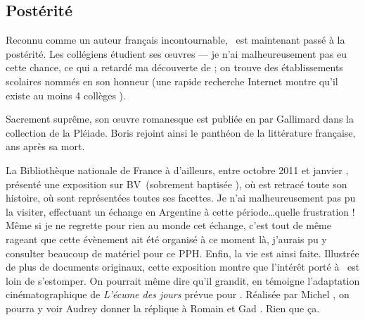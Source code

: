 \subsection{Postérité}
Reconnu comme un auteur français incontournable, \BV\ est maintenant passé à la postérité.
Les collégiens étudient ses \oe{}uvres --- je n'ai malheureusement pas eu cette chance,
ce qui a retardé ma découverte de \BV; on trouve des établissements scolaires nommés en
son honneur (une rapide recherche Internet montre qu'il existe au moins 4 collèges \BV).

Sacrement suprême, son \oe{}uvre romanesque est publiée en  par Gallimard dans la collection
de la Pléiade. Boris rejoint ainsi le panthéon de la littérature française,  ans après sa mort.

La Bibliothèque nationale de France à d'ailleurs, entre octobre 2011 et janvier , présenté
une exposition sur BV\ (sobrement baptisée \emph{\BV}), où est retracé toute son histoire, où sont
représentées toutes ses facettes. Je n'ai malheureusement pas pu la visiter, effectuant un échange en Argentine à cette période\ldots quelle frustration ! Même si je ne regrette pour rien au monde cet échange, c'est tout de même rageant que cette évènement ait été organisé à ce moment là, j'aurais pu y consulter beaucoup de matériel pour ce PPH. Enfin, la vie est ainsi faite. Illustrée de plus de  documents originaux, cette
exposition montre que l'intérêt porté à \BV\ est loin de s'estomper. On pourrait même dire qu'il
grandit, en témoigne l'adaptation cinématographique de \emph{L'écume des jours} prévue pour .
Réalisée par Michel , on pourra y voir Audrey  donner la réplique à
Romain  et Gad . Rien que ça.




